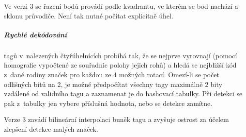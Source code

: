   Ve verzi 3 se řazení bodů provádí podle kvadrantu, ve kterém se bod nachází a sklonu průvodiče. Není tak nutné počítat explicitně úhel. \cite{apriltag3}

  \subparagraph{Rychlé dekódování} tagů v~nalezených čtyřúhelnících probíhá tak, že se nejprve vyrovnají (pomocí homografie vypočtené ze souřadnic polohy jejich rohů) a hledá se nejbližší kód z~dané rodiny značek pro každou ze 4 možných rotací. Omezí-li se počet odlišných bitů na 2, je možné předpočítat všechny tagy maximálně 2 bity vzdálené od validního tagu a zaznamenat je do hashovací tabulky. Při detekci se pak z~tabulky jen vybere příslušná hodnota, nebo se detekce zamítne. \cite{apriltag2}
  
  Verze 3 zavádí bilineární interpolaci buněk tagu a zvyšuje ostrost za účelem zlepšení detekce malých značek. \cite{apriltag3}